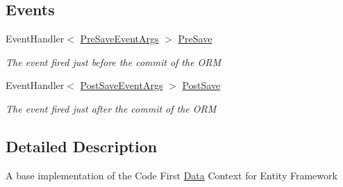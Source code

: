 \subsection*{Events}
\begin{DoxyCompactItemize}
\item 
Event\-Handler$<$ \hyperlink{class_highway_1_1_data_1_1_interceptors_1_1_events_1_1_pre_save_event_args}{Pre\-Save\-Event\-Args} $>$ \hyperlink{class_highway_1_1_data_1_1_entity_framework_1_1_contexts_1_1_entity_framework_context_a4e307f212412dfd562cd70640d67709b}{Pre\-Save}
\begin{DoxyCompactList}\small\item\em The event fired just before the commit of the O\-R\-M \end{DoxyCompactList}\item 
Event\-Handler$<$ \hyperlink{class_highway_1_1_data_1_1_interceptors_1_1_events_1_1_post_save_event_args}{Post\-Save\-Event\-Args} $>$ \hyperlink{class_highway_1_1_data_1_1_entity_framework_1_1_contexts_1_1_entity_framework_context_a2297153144a3e1240cb4526eb963b889}{Post\-Save}
\begin{DoxyCompactList}\small\item\em The event fired just after the commit of the O\-R\-M \end{DoxyCompactList}\end{DoxyCompactItemize}


\subsection{Detailed Description}
A base implementation of the Code First \hyperlink{namespace_highway_1_1_data}{Data} Context for Entity Framework 



